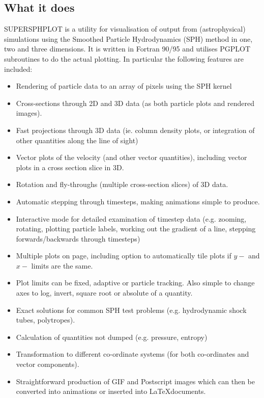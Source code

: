\documentclass[a4paper,11pt]{article}
\begin{document}
\subsection{What it does}
SUPERSPHPLOT is a utility for visualisation of output from (astrophysical) simulations using the
Smoothed Particle Hydrodynamics (SPH) method in one, two and three dimensions.
It is written in Fortran 90/95 and
utilises PGPLOT subroutines to do the actual plotting. In particular the following
features are included:
\begin{itemize}
\item Rendering of particle data to an array of pixels using the SPH kernel
\item Cross-sections through 2D and 3D data (as both particle plots and rendered
images).
\item Fast projections through 3D data (ie. column density plots, or integration of
other quantities along the line of sight)
\item Vector plots of the velocity (and other vector quantities), including vector
plots in a cross section slice in 3D.
\item Rotation and fly-throughs (multiple cross-section slices) of 3D data.
\item Automatic stepping through timesteps, making animations simple to produce.
\item Interactive mode for detailed examination of timestep data (e.g. zooming,
rotating, plotting particle labels, working out the gradient of a line, stepping forwards/backwards
through timesteps)
\item Multiple plots on page, including option to automatically tile plots if $y-$ and $x-$ limits
are the same.
\item Plot limits can be fixed, adaptive or particle tracking. Also simple to change
axes to log, invert, square root or absolute of a quantity.
\item Exact solutions for common SPH test problems (e.g. hydrodynamic shock tubes,
polytropes).
\item Calculation of quantities not dumped (e.g. pressure, entropy)
\item Transformation to different co-ordinate systems (for both co-ordinates and
vector components).
\item Straightforward production of GIF and Postscript images which can then be
converted into animations or inserted into \LaTeX documents.
\end{itemize}
\end{document}
